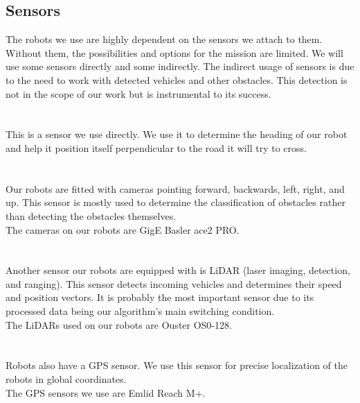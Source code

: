     \subsection{Sensors}
        The robots we use are highly dependent on the sensors we attach to them. Without them, the possibilities and options for the mission are limited. We will use some sensors directly and some indirectly. The indirect usage of sensors is due to the need to work with detected vehicles and other obstacles. This detection is not in the scope of our work but is instrumental to its success.\\\\
        \\
            This is a sensor we use directly. We use it to determine the heading of our robot and help it position itself perpendicular to the road it will try to cross.\\\\
        \\
            Our robots are fitted with cameras pointing forward, backwards, left, right, and up. This sensor is mostly used to determine the classification of obstacles rather than detecting the obstacles themselves.\\
            The cameras on our robots are GigE Basler ace2 PRO.\\\\
        \\
            Another sensor our robots are equipped with is LiDAR (laser imaging, detection, and ranging). This sensor detects incoming vehicles and determines their speed and position vectors. It is probably the most important sensor due to its processed data being our algorithm's main switching condition.\\
            The LiDARs used on our robots are Ouster OS0-128.\\\\
        \\
            Robots also have a GPS sensor. We use this sensor for precise localization of the robots in global coordinates.\\
                    The GPS sensors we use are Emlid Reach M+.